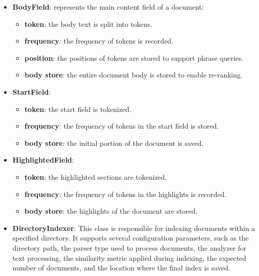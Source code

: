 \begin{itemize}
    \item \textbf{BodyField}: represents the main content field of a document:
        \begin{itemize}
            \item \textbf{token}: the body text is split into tokens.
            \item \textbf{frequency}: the frequency of tokens is recorded.
            \item \textbf{position}: the positions of tokens are stored to support phrase queries.
            \item \textbf{body store}: the entire document body is stored to enable re-ranking.
        \end{itemize}
        
    \item \textbf{StartField}: 
        \begin{itemize}
            \item \textbf{token}: the start field is tokenized.
            \item \textbf{frequency}: the frequency of tokens in the start field is stored.
            \item \textbf{body store}: the initial portion of the document is saved.
        \end{itemize}
        
    \item \textbf{HighlightedField}: 
        \begin{itemize}
            \item \textbf{token}: the highlighted sections are tokenized.
            \item \textbf{frequency}: the frequency of tokens in the highlights is recorded.
            \item \textbf{body store}: the highlights of the document are stored.
        \end{itemize}
        
    \item \textbf{DirectoryIndexer}: This class is responsible for indexing documents within a specified directory. It supports several configuration parameters, such as the directory path, the parser type used to process documents, the analyzer for text processing, the similarity metric applied during indexing, the expected number of documents, and the location where the final index is saved.
\end{itemize}

